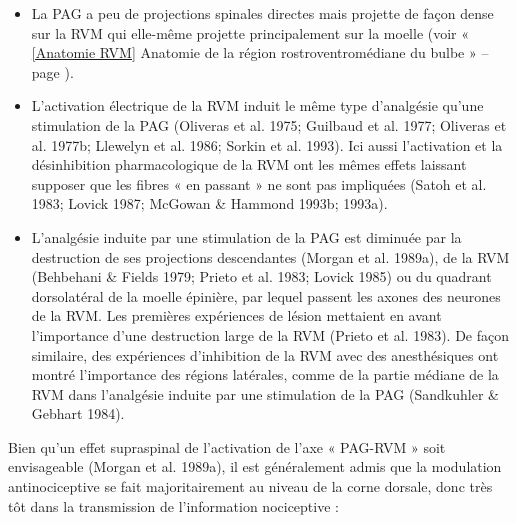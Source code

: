 \documentclass[a4paper,12pt,twoside]{report}
\begin{document}
\begin{itemize}
\item La PAG a peu de projections spinales directes mais projette de façon dense sur la RVM qui elle-même projette principalement sur la moelle (voir « \ref{Anatomie RVM} Anatomie de la région rostroventromédiane du bulbe » – page \pageref{Anatomie RVM}). 
\item L’activation électrique de la RVM induit le même type d’analgésie qu’une stimulation de la PAG (Oliveras et al. 1975; Guilbaud et al. 1977; Oliveras et al. 1977b; Llewelyn et al. 1986; Sorkin et al. 1993). Ici aussi l’activation et la désinhibition pharmacologique de la RVM ont les mêmes effets laissant supposer que les fibres « en passant » ne sont pas impliquées (Satoh et al. 1983; Lovick 1987; McGowan \& Hammond 1993b; 1993a).
\item L’analgésie induite par une stimulation de la PAG est diminuée par la destruction de ses projections descendantes (Morgan et al. 1989a), de la RVM (Behbehani \& Fields 1979; Prieto et al. 1983; Lovick 1985) ou du quadrant dorsolatéral de la moelle épinière, par lequel passent les axones des neurones de la RVM. Les premières expériences de lésion mettaient en avant l’importance d’une destruction large de la RVM (Prieto et al. 1983). De façon similaire, des expériences d’inhibition de la RVM avec des anesthésiques ont montré l’importance des régions latérales, comme de la partie médiane de la RVM dans l’analgésie induite par une stimulation de la PAG (Sandkuhler \& Gebhart 1984).
\end{itemize}

\bigskip

Bien qu’un effet supraspinal de l’activation de l’axe « PAG-RVM » soit envisageable (Morgan et al. 1989a), il est généralement admis que la modulation antinociceptive se fait majoritairement au niveau de la corne dorsale, donc très tôt dans la transmission de l’information nociceptive :
\end{document}
